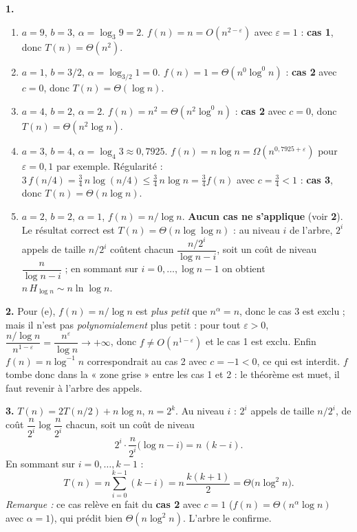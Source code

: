 \documentclass[11pt,a4paper]{article}
\begin{document}
\reponse
\textbf{1.}
\begin{enumerate}[label=(\alph*),leftmargin=*,itemsep=4pt]
  \item $a=9$, $b=3$, $\alpha=\log_3 9=2$. $f(n)=n=O(n^{2-\varepsilon})$ avec
        $\varepsilon=1$ : \textbf{cas 1}, donc $T(n)=\Theta(n^{2})$.
  \item $a=1$, $b=3/2$, $\alpha=\log_{3/2}1=0$. $f(n)=1=\Theta(n^{0}\log^{0}n)$ :
        \textbf{cas 2} avec $c=0$, donc $T(n)=\Theta(\log n)$.
  \item $a=4$, $b=2$, $\alpha=2$. $f(n)=n^{2}=\Theta(n^{2}\log^{0}n)$ :
        \textbf{cas 2} avec $c=0$, donc $T(n)=\Theta(n^{2}\log n)$.
  \item $a=3$, $b=4$, $\alpha=\log_4 3\approx0{,}7925$.
        $f(n)=n\log n = \Omega(n^{0{,}7925+\varepsilon})$ pour $\varepsilon=0{,}1$ par
        exemple. Régularité : $3\,f(n/4)=\tfrac34\,n\log(n/4)\le\tfrac34\,n\log n
        = \tfrac34 f(n)$ avec $c=\tfrac34<1$ : \textbf{cas 3}, donc
        $T(n)=\Theta(n\log n)$.
  \item $a=2$, $b=2$, $\alpha=1$, $f(n)=n/\log n$. \textbf{Aucun cas ne s'applique}
        (voir \textbf{2}). Le résultat correct est $T(n)=\Theta(n\log\log n)$ :
        au niveau $i$ de l'arbre, $2^{i}$ appels de taille $n/2^{i}$ coûtent chacun
        $\dfrac{n/2^{i}}{\log n - i}$, soit un coût de niveau $\dfrac{n}{\log n - i}$ ;
        en sommant sur $i=0,\dots,\log n-1$ on obtient $n\,H_{\log n}\sim n\ln\log n$.
\end{enumerate}

\textbf{2.} Pour (e), $f(n)=n/\log n$ est \emph{plus petit} que $n^{\alpha}=n$, donc le
cas 3 est exclu ; mais il n'est pas \emph{polynomialement} plus petit : pour tout
$\varepsilon>0$, $\dfrac{n/\log n}{n^{1-\varepsilon}} = \dfrac{n^{\varepsilon}}{\log n}
\to+\infty$, donc $f\ne O(n^{1-\varepsilon})$ et le cas 1 est exclu. Enfin
$f(n)=n\log^{-1}n$ correspondrait au cas 2 avec $c=-1<0$, ce qui est interdit.
$f$ tombe donc dans la « zone grise » entre les cas 1 et 2 : le théorème est muet,
il faut revenir à l'arbre des appels.

\textbf{3.} $T(n)=2T(n/2)+n\log n$, $n=2^{k}$. Au niveau $i$ :
$2^{i}$ appels de taille $n/2^{i}$, de coût $\dfrac{n}{2^{i}}\log\dfrac{n}{2^{i}}$
chacun, soit un coût de niveau
\[
  2^{i}\cdot\frac{n}{2^{i}}\big(\log n - i\big) = n\,(k-i).
\]
En sommant sur $i=0,\dots,k-1$ :
\[
  T(n)=n\sum_{i=0}^{k-1}(k-i) = n\,\frac{k(k+1)}{2} = \Theta\!\big(n\log^{2}n\big).
\]
\emph{Remarque :} ce cas relève en fait du \textbf{cas 2} avec $c=1$
($f(n)=\Theta(n^{\alpha}\log n)$ avec $\alpha=1$), qui prédit bien
$\Theta(n\log^{2}n)$. L'arbre le confirme.
\end{document}
